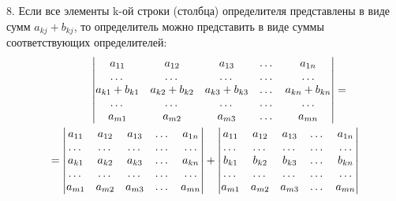 \documentclass[a4paper,12pt,oneside]{extbook}
\theoremstyle{numbered}
\theoremstyle{unnumbered}
\theoremstyle{named}
\theoremstyle{unnumbered}
\theoremstyle{named}
\theoremstyle{named}
\theoremstyle{named}
\begin{document}
8. Если все элементы k-ой строки (столбца) определителя представлены в виде сумм \(a_{kj} + b_{kj}\), то определитель можно представить в виде суммы соответствующих определителей:
\begin{gather*}
    \hspace{0.9cm}
    \begin{vmatrix}
        a_{11}          & a_{12}          & a_{13}          & \dots & a_{1n}          \\
        \dots           & \dots           & \dots           & \dots & \dots           \\
        a_{k1} + b_{k1} & a_{k2} + b_{k2} & a_{k3} + b_{k3} & \dots & a_{kn} + b_{kn} \\
        \dots           & \dots           & \dots           & \dots & \dots           \\
        a_{m1}          & a_{m2}          & a_{m3}          & \dots & a_{mn}          \\
    \end{vmatrix}
    =
    \\
    =
    \begin{vmatrix}
        a_{11} & a_{12} & a_{13} & \dots & a_{1n} \\
        \dots  & \dots  & \dots  & \dots & \dots  \\
        a_{k1} & a_{k2} & a_{k3} & \dots & a_{kn} \\
        \dots  & \dots  & \dots  & \dots & \dots  \\
        a_{m1} & a_{m2} & a_{m3} & \dots & a_{mn} \\
    \end{vmatrix}
    +
    \begin{vmatrix}
        a_{11} & a_{12} & a_{13} & \dots & a_{1n} \\
        \dots  & \dots  & \dots  & \dots & \dots  \\
        b_{k1} & b_{k2} & b_{k3} & \dots & b_{kn} \\
        \dots  & \dots  & \dots  & \dots & \dots  \\
        a_{m1} & a_{m2} & a_{m3} & \dots & a_{mn} \\
    \end{vmatrix}
\end{gather*}
\end{document}
